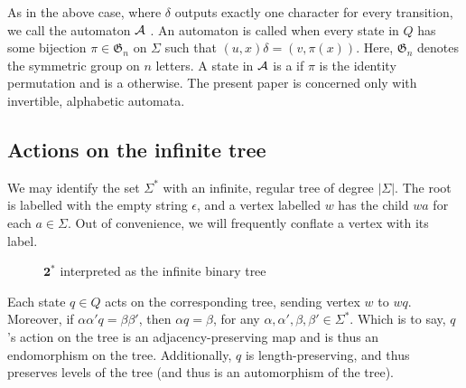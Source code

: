 \documentclass[11pt, titlepage]{article}
\begin{document}
As in the above case, where $\delta$ outputs exactly one character for
every transition, we call the automaton $\mathcal{A}$ . An
automaton is called  when every state in $Q$ has some
bijection $\pi \in \mathfrak{G}_n$ on $\Sigma$ such that
$(u, x)\delta = (v, \pi(x))$. Here, $\mathfrak{G}_n$ denotes the
symmetric group on $n$ letters. A state in $\mathcal{A}$ is a 
if $\pi$ is the identity permutation and is a 
otherwise. The present paper is concerned only with invertible,
alphabetic automata.

\subsection{Actions on the infinite tree}

We may identify the set $\Sigma^*$ with an infinite, regular tree of
degree $|\Sigma|$. The root is labelled with the empty string
$\epsilon$, and a vertex labelled $w$ has the child $wa$ for each
$a \in \Sigma$. Out of convenience, we will frequently conflate a
vertex with its label.

\begin{figure}
\begin{center}
\caption{$\textbf{2}^*$ interpreted as the infinite binary tree}
\end{center}
\end{figure}

Each state $q \in Q$ acts on the corresponding tree, sending vertex
$w$ to $wq$. Moreover, if $\alpha \alpha' q = \beta \beta'$, then
$\alpha q = \beta$, for any
$\alpha, \alpha', \beta, \beta' \in \Sigma^*$. Which is to say, $q$'s
action on the tree is an adjacency-preserving map and is thus an
endomorphism on the tree. Additionally, $q$ is length-preserving, and
thus preserves levels of the tree (and thus is an automorphism of the
tree).
\end{document}
